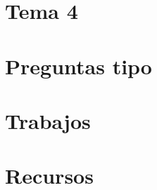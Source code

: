 \documentclass[12pt, twoside, openright]{report} %
\begin{document}
\part{Tema 4}


\part{Preguntas tipo}


\part{Trabajos}












\part{Recursos}



\end{document}
